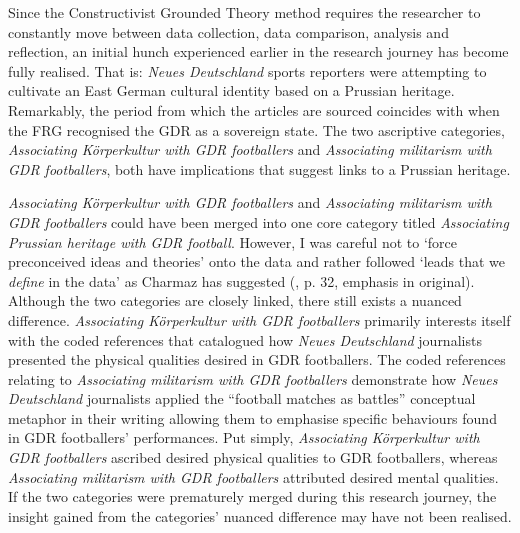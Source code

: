Since the Constructivist Grounded Theory method requires the researcher to constantly move between data collection, data comparison, analysis and reflection, an initial hunch experienced earlier in the research journey has become fully realised. That is: \textit{Neues Deutschland} sports reporters were attempting to cultivate an East German cultural identity based on a Prussian heritage. Remarkably, the period from which the articles are sourced coincides with when the FRG recognised the GDR as a sovereign state. The two ascriptive categories, \textit{Associating Körperkultur with GDR footballers} and \textit{Associating militarism with GDR footballers}, both have implications that suggest links to a Prussian heritage.

\textit{Associating Körperkultur with GDR footballers} and \textit{Associating militarism with GDR footballers} could have been merged into one core category titled \textit{Associating Prussian heritage with GDR football}. However, I was careful not to ‘force preconceived ideas and theories’ onto the data and rather followed ‘leads that we \textit{define} in the data’ as Charmaz has suggested (\citeyear{charmaz2014}, p. 32, emphasis in original). Although the two categories are closely linked, there still exists a nuanced difference. \textit{Associating Körperkultur with GDR footballers} primarily interests itself with the coded references that catalogued how \textit{Neues Deutschland} journalists presented the physical qualities desired in GDR footballers. The coded references relating to \textit{Associating militarism with GDR footballers} demonstrate how \textit{Neues Deutschland} journalists applied the “football matches as battles” conceptual metaphor in their writing allowing them to emphasise specific behaviours found in GDR footballers’ performances. Put simply, \textit{Associating Körperkultur with GDR footballers} ascribed desired physical qualities to GDR footballers, whereas \textit{Associating militarism with GDR footballers} attributed desired mental qualities. If the two categories were prematurely merged during this research journey, the insight gained from the categories’ nuanced difference may have not been realised.

